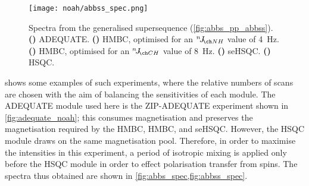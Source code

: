 \begin{figure}[!ht]
    \centering
    \texttt{[image: noah/abbss\_spec.png]}%
    {\label{fig:abbss_spec_a}}%
    {\label{fig:abbss_spec_bn}}%
    {\label{fig:abbss_spec_b}}%
    {\label{fig:abbss_spec_s}}%
    {\label{fig:abbss_spec_sn}}%
    \caption[Spectra from  generalised supersequence]{
        Spectra from the  generalised supersequence (\cref{fig:abbs_pp_abbss}).
        \textbf{()} ADEQUATE.
        \textbf{()} \nitrogen{} HMBC, optimised for an $\nJ{NH}$ value of \qty{4}{\Hz}.
        \textbf{()} \carbon{} HMBC, optimised for an $\nJ{CH}$ value of \qty{8}{\Hz}.
        \textbf{()} \nitrogen{} seHSQC.
        \textbf{()} \carbon{} HSQC.
    }
    \label{fig:abbss_spec}
\end{figure}

 shows some examples of such experiments, where the relative numbers of scans are chosen with the aim of balancing the sensitivities of each module.
The ADEQUATE module used here is the ZIP-ADEQUATE experiment shown in \cref{fig:adequate_noah}; this consumes  magnetisation and preserves the  magnetisation required by the \nitrogen{} HMBC, \carbon{} HMBC, and \nitrogen{} seHSQC.
However, the \carbon{} HSQC module draws on the same magnetisation pool.
Therefore, in order to maximise the intensities in this experiment, a period of isotropic mixing is applied only before the HSQC module in order to effect polarisation transfer from  spins.
The spectra thus obtained are shown in \cref{fig:abbs_spec,fig:abbss_spec}.

